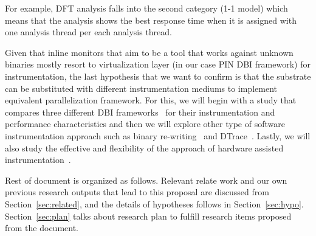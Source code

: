 For example,  DFT analysis falls into the second category (1-1 model) which
means that the analysis shows the best response time when it is assigned with
one analysis thread per each analysis thread.  

Given that inline monitors that aim to be a tool that works against unknown
binaries mostly resort to virtualization layer (in our case PIN DBI framework)
for instrumentation, the last hypothesis that we want to confirm is that the
substrate can be substituted with different instrumentation mediums to
implement equivalent parallelization framework. For this, we will begin with a
study that compares three different DBI frameworks~\cite{pin:pldi2005,
dynamorio, valgrind} for their instrumentation and performance characteristics
and then we will explore other type of software instrumentation approach such
as binary re-writing~\cite{brewriting:usenix2003} and DTrace~\cite{DTrace}.
Lastly, we will also study the effective and flexibility of the approach of
hardware assisted instrumentation~\cite{lba:isca2008, raksha:isca2007}.

Rest of document is organized as follows. Relevant relate work and our own
previous research outputs that lead to this proposal are discussed from
Section~\ref{sec:related}, and the details of hypotheses follows in
Section~\ref{sec:hypo}. Section~\ref{sec:plan} talks about research plan to
fulfill research items proposed from the document.

